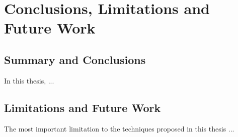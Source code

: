 \chapter{Conclusions, Limitations and Future Work}
\label{ch:conclusion}

\section{Summary and Conclusions}
In this thesis, ...

\section{Limitations and Future Work}
The most important limitation to the techniques proposed in this thesis ...
